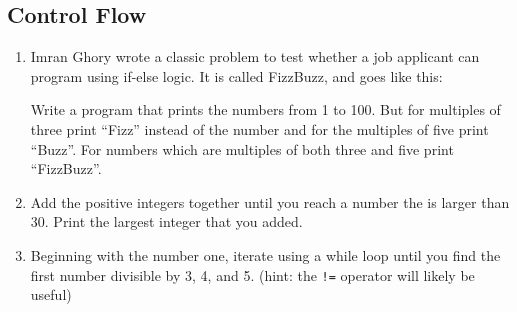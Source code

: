 \documentclass[letterpaper,12pt]{article}
\begin{document}
\subsection{Control Flow}

\begin{enumerate}
    \item Imran Ghory wrote a classic problem to test whether a job applicant can program using if-else logic. It is called FizzBuzz, and goes like this: 
    \begin{displayquote}
    Write a program that prints the numbers from 1 to 100. But for multiples of three print “Fizz” instead of the number and for the multiples of five print “Buzz”. For numbers which are multiples of both three and five print “FizzBuzz”.
    \end{displayquote}
    \item Add the positive integers together until you reach a number the is larger than 30. Print the largest integer that you added. 
    \item Beginning with the number one, iterate using a while loop until you find the first number divisible by 3, 4, and 5. (hint: the \verb|!=| operator will likely be useful)
\end{enumerate}
\end{document}
